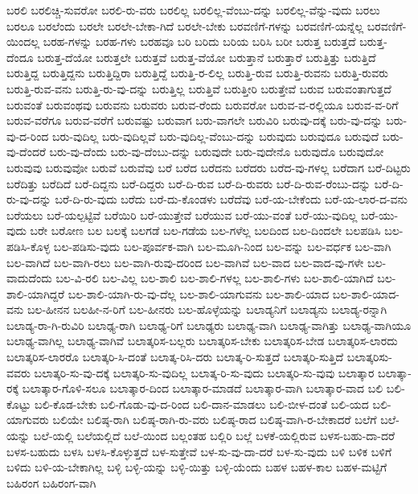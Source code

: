 {ಬರಲಿ
ಬರಲಿಚ್ಚಿ-ಸುವರೋ
ಬರಲಿ-ರು-ವರು
ಬರಲಿಲ್ಲ
ಬರಲಿಲ್ಲ-ವೆಂಬು-ದನ್ನು
ಬರಲಿಲ್ಲ-ವೆನ್ನು-ವುದು
ಬರಲು
ಬರಲೂ
ಬರಲೆಂದು
ಬರಲೇ
ಬರಲೇ-ಬೇಕಾ-ಗಿದೆ
ಬರಲೇ-ಬೇಕು
ಬರವಣಿಗೆ-ಗಳನ್ನು
ಬರವಣಿಗೆ-ಯನ್ನೆಲ್ಲ
ಬರವಣಿಗೆ-ಯಿಂದಲ್ಲ
ಬರಹ-ಗಳನ್ನು
ಬರಹ-ಗಳು
ಬರಹವೂ
ಬರಿ
ಬರಿದು
ಬರಿಯ
ಬರಿಸಿ
ಬರೀ
ಬರುತ್ತ
ಬರುತ್ತದೆ
ಬರುತ್ತ-ದೆಂದೂ
ಬರುತ್ತ-ದೆಯೋ
ಬರುತ್ತಲೇ
ಬರುತ್ತವೆ
ಬರುತ್ತ-ವೆಯೋ
ಬರುತ್ತಾನೆ
ಬರುತ್ತಾರೆ
ಬರುತ್ತಿತ್ತು
ಬರುತ್ತಿದೆ
ಬರುತ್ತಿದ್ದ
ಬರುತ್ತಿದ್ದನು
ಬರುತ್ತಿದ್ದಿರಾ
ಬರುತ್ತಿದ್ದೆ
ಬರುತ್ತಿ-ರ-ಲಿಲ್ಲ
ಬರುತ್ತಿ-ರುವ
ಬರುತ್ತಿ-ರುವನು
ಬರುತ್ತಿ-ರುವರು
ಬರುತ್ತಿ-ರುವ-ವನು
ಬರುತ್ತಿ-ರು-ವು-ದನ್ನು
ಬರುತ್ತಿಲ್ಲ
ಬರುತ್ತಿವೆ
ಬರುತ್ತೀರಿ
ಬರುತ್ತೇವೆ
ಬರುವ
ಬರುವಂತಾಗುತ್ತದೆ
ಬರುವಂತೆ
ಬರುವಂಥವು
ಬರುವನು
ಬರುವರು
ಬರುವ-ರೆಂದು
ಬರುವರೋ
ಬರುವ-ವ-ರಲ್ಲಿಯೂ
ಬರುವ-ವ-ರಿಗೆ
ಬರುವ-ವರೆಗೂ
ಬರುವ-ವರೆಗೆ
ಬರುವಷ್ಟು
ಬರುವಾಗ
ಬರು-ವಾಗಲೇ
ಬರುವಿರಿ
ಬರುವು-ದಕ್ಕೆ
ಬರು-ವು-ದನ್ನು
ಬರು-ವು-ದ-ರಿಂದ
ಬರು-ವುದಿಲ್ಲ
ಬರು-ವುದಿಲ್ಲವೆ
ಬರು-ವುದಿಲ್ಲ-ವೆಂಬು-ದನ್ನು
ಬರುವುದು
ಬರುವುದೂ
ಬರುವುದೆ
ಬರು-ವು-ದೆಂದರೆ
ಬರು-ವು-ದೆಂದು
ಬರು-ವು-ದೆಂಬು-ದನ್ನು
ಬರುವುದೇ
ಬರು-ವುದೇನೊ
ಬರುವುದೊ
ಬರುವುದೋ
ಬರುವುವು
ಬರುವುವೋ
ಬರುವೆ
ಬರುವೆವು
ಬರೆ
ಬರೆದ
ಬರೆದನು
ಬರೆದರು
ಬರೆದ-ವು-ಗಳಲ್ಲ
ಬರೆದಾಗ
ಬರೆ-ದಿಟ್ಟರು
ಬರೆದಿತ್ತು
ಬರೆದಿದೆ
ಬರೆ-ದಿದ್ದನು
ಬರೆ-ದಿದ್ದರು
ಬರೆ-ದಿ-ರುವ
ಬರೆ-ದಿ-ರುವರು
ಬರೆ-ದಿ-ರುವ-ರೆಂಬು-ದನ್ನು
ಬರೆ-ದಿ-ರು-ವು-ದನ್ನು
ಬರೆ-ದಿ-ರು-ವುದು
ಬರೆದು
ಬರೆ-ದು-ಕೊಂಡಳು
ಬರೆದೆವು
ಬರೆ-ಯ-ಬೇಕೆಂದು
ಬರೆ-ಯ-ಲಾರ-ದ-ವನು
ಬರೆಯಲು
ಬರೆ-ಯಲ್ಪಟ್ಟಿವೆ
ಬರೆಯಿರಿ
ಬರೆ-ಯುತ್ತೇವೆ
ಬರೆಯುವ
ಬರೆ-ಯು-ವಂತೆ
ಬರೆ-ಯು-ವುದಿಲ್ಲ
ಬರೆ-ಯು-ವುದು
ಬರೇ
ಬರೋಣ
ಬಲ
ಬಲಕ್ಕೆ
ಬಲಗಡೆ
ಬಲ-ಗಡೆಯ
ಬಲ-ಗಳೆಲ್ಲ
ಬಲದಿಂದ
ಬಲ-ದಿಂದಲೇ
ಬಲಪಡಿಸಿ
ಬಲ-ಪಡಿಸಿ-ಕೊಳ್ಳ
ಬಲ-ಪಡಿಸು-ವುದು
ಬಲ-ಪೂರ್ವಕ-ವಾಗಿ
ಬಲ-ಮೂಗಿ-ನಿಂದ
ಬಲ-ವನ್ನು
ಬಲ-ವರ್ಧಕ
ಬಲ-ವಾಗಿ
ಬಲ-ವಾಗಿದೆ
ಬಲ-ವಾಗಿ-ರಲು
ಬಲ-ವಾಗಿ-ರುವು-ದರಿಂದ
ಬಲ-ವಾಗಿವೆ
ಬಲ-ವಾದ
ಬಲ-ವಾದ-ವು-ಗಳೇ
ಬಲ-ವಾದುದೆಂದು
ಬಲ-ವಿ-ರಲಿ
ಬಲ-ವಿಲ್ಲ
ಬಲ-ಶಾಲಿ
ಬಲ-ಶಾಲಿ-ಗಳಲ್ಲ
ಬಲ-ಶಾಲಿ-ಗಳು
ಬಲ-ಶಾಲಿ-ಯಾಗಿದೆ
ಬಲ-ಶಾಲಿ-ಯಾಗಿದ್ದರೆ
ಬಲ-ಶಾಲಿ-ಯಾಗಿ-ರು-ವು-ದೆಲ್ಲ
ಬಲ-ಶಾಲಿ-ಯಾಗುವನು
ಬಲ-ಶಾಲಿ-ಯಾದ
ಬಲ-ಶಾಲಿ-ಯಾದ-ವನು
ಬಲ-ಹೀನನ
ಬಲಹೀ-ನ-ರಿಗೆ
ಬಲ-ಹೀನರು
ಬಲ-ಹೊಳ್ಳೆಯನ್ನು
ಬಲಾಡ್ಯನಿಗೆ
ಬಲಾಡ್ಯನು
ಬಲಾಡ್ಯ-ರನ್ನಾಗಿ
ಬಲಾಡ್ಯ-ರಾ-ಗಿ-ರುವಿರಿ
ಬಲಾಢ್ಯ-ರಾಗಿ
ಬಲಾಢ್ಯ-ರಿಗೆ
ಬಲಾಢ್ಯರು
ಬಲಾಢ್ಯ-ವಾಗಿ
ಬಲಾಢ್ಯ-ವಾಗಿತ್ತು
ಬಲಾಢ್ಯ-ವಾಗಿಯೂ
ಬಲಾಢ್ಯ-ವಾಗಿಲ್ಲ
ಬಲಾಢ್ಯ-ವಾಗಿವೆ
ಬಲಾತ್ಕರಿಸ-ಬಲ್ಲರು
ಬಲಾತ್ಕರಿಸ-ಬೇಕು
ಬಲಾತ್ಕರಿಸ-ಬೇಡ
ಬಲಾತ್ಕರಿಸ-ಲಾರದು
ಬಲಾತ್ಕರಿಸ-ಲಾರರೊ
ಬಲಾತ್ಕರಿ-ಸಿ-ದಂತೆ
ಬಲಾತ್ಕ-ರಿಸಿ-ದರು
ಬಲಾತ್ಕ-ರಿ-ಸುತ್ತದೆ
ಬಲಾತ್ಕರಿ-ಸುತ್ತಿದೆ
ಬಲಾತ್ಕರಿಸು-ವವರು
ಬಲಾತ್ಕರಿ-ಸು-ವು-ದಕ್ಕೆ
ಬಲಾತ್ಕರಿ-ಸು-ವುದಿಲ್ಲ
ಬಲಾತ್ಕ-ರಿ-ಸು-ವುದು
ಬಲಾತ್ಕರಿ-ಸು-ವುವು
ಬಲಾತ್ಕಾರ
ಬಲಾತ್ಕಾ-ರಕ್ಕೆ
ಬಲಾತ್ಕಾರ-ಗೊಳಿ-ಸಲೂ
ಬಲಾತ್ಕಾರ-ದಿಂದ
ಬಲಾತ್ಕಾರ-ಮಾಡದೆ
ಬಲಾತ್ಕಾರ-ವಾಗಿ
ಬಲಾತ್ಕಾರ-ವಾದ
ಬಲಿ
ಬಲಿ-ಕೊಟ್ಟು
ಬಲಿ-ಕೊಡ-ಬೇಕು
ಬಲಿ-ಗೊಡು-ವು-ದ-ರಿಂದ
ಬಲಿ-ದಾನ-ಮಾಡಲು
ಬಲಿ-ಬೀಳ-ದಂತೆ
ಬಲಿ-ಯದ
ಬಲಿ-ಯಾಗುವರು
ಬಲಿಯೇ
ಬಲಿಷ್ಠ-ರಾಗಿ
ಬಲಿಷ್ಠ-ರಾಗಿ-ರು-ವರು
ಬಲಿಷ್ಠ-ರಾದ
ಬಲಿಷ್ಠ-ವಾಗಿ-ರ-ಬೇಕಾದರೆ
ಬಲೆಗೆ
ಬಲೆ-ಯನ್ನು
ಬಲೆ-ಯಲ್ಲಿ
ಬಲೆಯಲ್ಲಿದೆ
ಬಲೆ-ಯಿಂದ
ಬಲ್ಲಂತಹ
ಬಲ್ಲಿರಿ
ಬಲ್ಲೆ
ಬಳಕೆ-ಯಲ್ಲಿರುವ
ಬಳಸ-ಬಹು-ದಾ-ದರೆ
ಬಳಸ-ಬಹುದು
ಬಳಸಿ
ಬಳಸಿ-ಕೊಳ್ಳುತ್ತದೆ
ಬಳ-ಸುತ್ತೇವೆ
ಬಳ-ಸು-ವು-ದಾ-ದರೆ
ಬಳ-ಸು-ವುದು
ಬಳಿ
ಬಳಿಕ
ಬಳಿಗೆ
ಬಳಿದು
ಬಳಿ-ಯ-ಬೇಕಾಗಿಲ್ಲ
ಬಳ್ಳಿ
ಬಳ್ಳಿ-ಯನ್ನು
ಬಳ್ಳಿ-ಯಿತ್ತು
ಬಳ್ಳಿ-ಯೆಂದು
ಬಹಳ
ಬಹಳ-ಕಾಲ
ಬಹಳ-ಮಟ್ಟಿಗೆ
ಬಹಿರಂಗ
ಬಹಿರಂಗ-ವಾಗಿ
}
